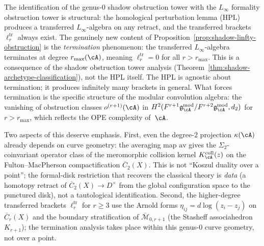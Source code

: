 \begin{remark}
\label{rem:shadow-termination-novelty}
The identification of the genus-$0$ shadow obstruction tower with the
$L_\infty$ formality obstruction tower is structural:
the homological perturbation lemma (HPL) produces a
transferred $L_\infty$-algebra on any retract, and the
transferred brackets $\ell_r^{\mathrm{tr}}$ always exist.
The genuinely new content of
Proposition~\ref{prop:shadow-linfty-obstruction} is the
\emph{termination} phenomenon: the transferred $L_\infty$-algebra
terminates at degree $r_{\max}(\cA)$, meaning
$\ell_r^{\mathrm{tr}} = 0$ for all $r > r_{\max}$. This
is a consequence of the shadow obstruction tower analysis
(Theorem~\ref{thm:shadow-archetype-classification}),
not the HPL itself. The HPL is agnostic about termination;
it produces infinitely many brackets in general. What
forces termination is the specific structure of the modular
convolution algebra: the vanishing of obstruction classes
$o^{(r+1)}(\cA)$ in
$H^2(F^{r+1}\gAmod/F^{r+2}\gAmod, d_2)$
for $r > r_{\max}$, which reflects the OPE complexity of~$\cA$.

Two aspects of this deserve emphasis. First, even the
degree-$2$ projection $\kappa(\cA)$
already depends on curve geometry:
the averaging map $\mathrm{av}$ gives the
$\Sigma_2$-coinvariant operator class of the meromorphic collision
kernel $K_\cA^{\mathrm{coll}}(z)$ on the
Fulton--MacPherson compactification $\overline{C}_2(X)$.
This is not ``Koszul duality over a point''; the
formal-disk restriction that recovers the classical theory
is \emph{data} (a homotopy retract of
$\overline{C}_2(X) \to D^\times$ from the
global configuration space to the punctured disk), not a
tautological identification. Second, the higher-degree
transferred brackets $\ell_r^{\mathrm{tr}}$ for $r \geq 3$
use the Arnold forms $\eta_{ij} = d\log(z_i - z_j)$ on
$\overline{C}_r(X)$ and the boundary stratification of
$\overline{\mathcal{M}}_{0,r+1}$
(the Stasheff associahedron $K_{r+1}$); the termination
analysis takes place within this genus-$0$ curve geometry,
not over a point.
\end{remark}


